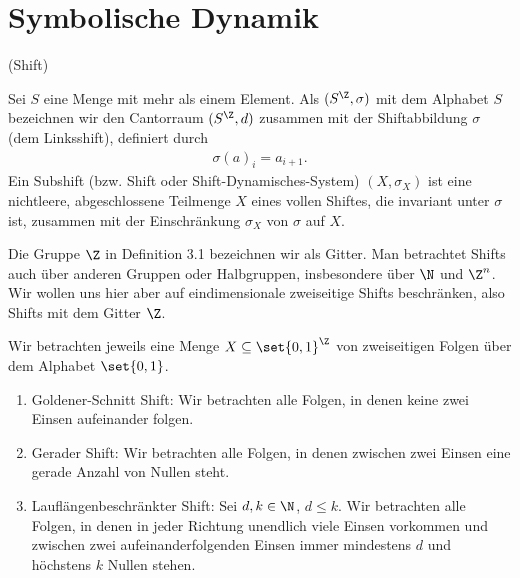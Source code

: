 \section{Symbolische Dynamik}
\begin{definition} (Shift)

  Sei $S$ eine Menge mit mehr als einem Element. Als  $(S^\Z, \sigma)$ mit dem Alphabet $S$ bezeichnen wir den Cantorraum $(S^\Z, d)$ zusammen mit der Shiftabbildung $\sigma$ (dem Linksshift), definiert durch
  \begin{align*}
    \sigma(a)_i = a_{i+1}.
  \end{align*}
  Ein Subshift (bzw. Shift oder Shift-Dynamisches-System) $(X, \sigma_X)$ ist eine nichtleere, abgeschlossene Teilmenge $X$ eines vollen Shiftes, die invariant unter $\sigma$ ist, zusammen mit der Einschränkung $\sigma_X$ von $\sigma$ auf $X$.
\end{definition}
\begin{bemerkung}
  Die Gruppe $\Z$ in Definition 3.1 bezeichnen wir als Gitter. Man betrachtet Shifts auch über anderen Gruppen oder Halbgruppen, insbesondere über $\N$ und $\Z^n$. Wir wollen uns hier aber auf eindimensionale zweiseitige Shifts beschränken, also Shifts mit dem Gitter $\Z$. 
\end{bemerkung}
\begin{beispiel}
  Wir betrachten jeweils eine Menge $X \subseteq \set{0,1}^\Z$ von zweiseitigen Folgen über dem Alphabet $\set {0,1}$. 
\enu{\alph}
  \begin{enumerate}
  \item Goldener-Schnitt Shift:
Wir betrachten alle Folgen, in denen keine zwei Einsen aufeinander folgen. 
\item Gerader Shift:
Wir betrachten alle Folgen, in denen zwischen zwei Einsen eine gerade Anzahl von Nullen steht.
\item Lauflängenbeschränkter Shift: Sei $d, k \in \N$, $d \leq k$. Wir betrachten alle Folgen, in denen in jeder Richtung unendlich viele Einsen vorkommen und zwischen zwei aufeinanderfolgenden Einsen immer mindestens $d$ und höchstens $k$ Nullen stehen. 
  \end{enumerate}
\end{beispiel}
